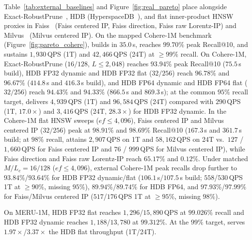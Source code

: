 Table~\ref{tab:external_baselines} and Figure~\ref{fig:real_pareto} place \rquiver{} alongside {Exact-RobustPrune}~\cite{prokhorenkova2022hyperbolic}, {HDB} ({HyperspaceDB}~\cite{glukhota2026hyperspacedb}), and flat inner-product {HNSW} proxies in {Faiss}~\cite{douze2024faiss} ({Faiss centered IP}, {Faiss direction}, {Faiss raw Lorentz-IP}) and {Milvus}~\cite{wang2021milvus} ({Milvus centered IP}).
On the mapped {Cohere-1M} benchmark (Figure~\ref{fig:pareto_cohere}), \rquiver{} builds in $35.0$\,s, reaches $99.70\%$ peak Recall@10, and sustains $1{,}930$\,QPS (1T) and $42{,}466$\,QPS (24T) at $\ge 99\%$ recall.
On {Cohere-1M}, {Exact-RobustPrune} ($16/128$, $L\le2{,}048$) reaches $93.94\%$ peak Recall@10 ($75.5$\,s build), {HDB FP32 dynamic} and {HDB FP32 flat} ($32/256$) reach $96.78\%$ and $96.67\%$ ($414.8$\,s and $416.3$\,s build), and {HDB FP64 dynamic} and {HDB FP64 flat} ($32/256$) reach $94.43\%$ and $94.33\%$ ($866.5$\,s and $869.3$\,s); at the common $95\%$ recall target, \rquiver{} delivers $4{,}939$\,QPS (1T) and $96{,}584$\,QPS (24T) compared with $290$\,QPS (1T, $17.0\times$) and $3{,}416$\,QPS (24T, $28.3\times$) for {HDB FP32 dynamic}.
In the {Cohere-1M} flat {HNSW} sweeps ($ef\le4{,}096$), {Faiss centered IP} and {Milvus centered IP} ($32/256$) peak at $98.91\%$ and $98.69\%$ Recall@10 ($167.3$\,s and $361.7$\,s build; at $98\%$ recall, \rquiver{} attains $2{,}907$\,QPS on 1T and $58{,}162$\,QPS on 24T vs.\ $127$ / $1{,}660$\,QPS for {Faiss centered IP} and $76$ / $999$\,QPS for {Milvus centered IP}), while {Faiss direction} and {Faiss raw Lorentz-IP} reach $65.17\%$ and $0.12\%$. Under matched $M/L_c = 16/128$ ($ef \le 4{,}096$), external {Cohere-1M} peak recalls drop further to $93.84\%$/$93.64\%$ for {HDB FP32 dynamic/flat} ($106.1$\,s/$107.5$\,s build; $558$/$530$\,QPS 1T at $\ge 90\%$, missing $95\%$), $89.94\%$/$89.74\%$ for {HDB FP64}, and $97.93\%$/$97.99\%$ for {Faiss/Milvus centered IP} ($517$/$176$\,QPS 1T at $\ge 95\%$, missing $98\%$).

On {MERU-1M}, HDB FP32 flat reaches $1{,}296$/$15{,}890$\,QPS at $99.026\%$ recall and HDB FP32 dynamic reaches $1{,}188$/$13{,}780$ at $99.312\%$. At the $99\%$ target, \rquiver{} serves $1.97\times$/$3.37\times$ the HDB flat throughput (1T/24T).

